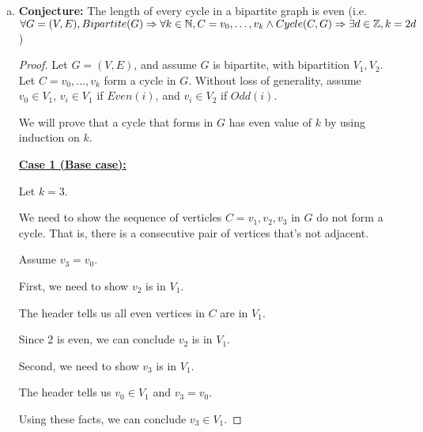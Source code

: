 \documentclass[12pt]{article}
\begin{document}
\begin{enumerate}[a.]
    \item

    \textbf{Conjecture:} The length of every cycle in a bipartite graph is even
    (i.e. $\forall G = (V,E),\\ Bipartite(G) \Rightarrow \forall k \in \mathbb{N}, C = v_0,\dots,v_k \land Cycle(C,G) \Rightarrow \exists d \in \mathbb{Z}, k = 2d$)

    \bigskip

    \begin{proof}
        \bigskip

        Let $G = (V,E)$, and assume $G$ is bipartite, with bipartition $V_1,V_2$.
        Let $C = v_0,...,v_k$ form a cycle in $G$. Without loss of generality,
        assume $v_0 \in V_1$, $v_i \in V_1$ if $Even(i)$, and $v_i \in V_2$ if $Odd(i)$.

        \bigskip

        We will prove that a cycle that forms in $G$ has even value of $k$ by using induction on $k$.

        \bigskip

        \underline{\textbf{Case 1 (Base case):}}

        \bigskip

        Let $k = 3$.

        \bigskip

        We need to show the sequence of verticles $C=v_1,v_2,v_3$ in $G$ do not
        form a cycle. That is, there is a consecutive pair of vertices that's not
        adjacent.

        \bigskip

        Assume $v_3 = v_0$.

        \bigskip

        First, we need to show $v_2$ is in $V_1$.

        \bigskip

        The header tells us all even vertices in $C$ are in $V_1$.

        \bigskip

        Since 2 is even, we can conclude $v_2$ is in $V_1$.

        \bigskip

        Second, we need to show $v_3$ is in $V_1$.

        \bigskip

        The header tells us $v_0 \in V_1$ and $v_3 = v_0$.

        \bigskip

        Using these facts, we can conclude $v_3 \in V_1$.


\end{proof}
\end{enumerate}
\end{document}
